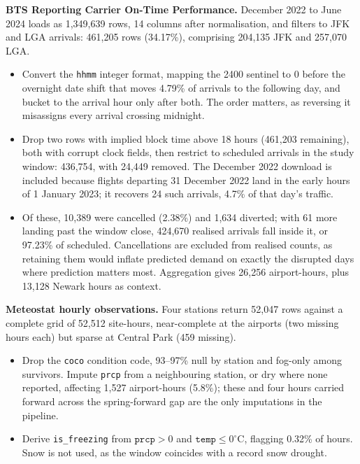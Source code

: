 \documentclass[11pt]{article}
\begin{document}
\textbf{BTS Reporting Carrier On-Time Performance.} December 2022 to June 2024
loads as 1,349,639 rows, 14 columns after normalisation, and filters to JFK and
LGA arrivals: 461,205 rows (34.17\%), comprising 204,135 JFK and 257,070 LGA.
\begin{itemize}
  \item Convert the \texttt{hhmm} integer format, mapping the 2400 sentinel to 0
        before the overnight date shift that moves 4.79\% of arrivals to the
        following day, and bucket to the arrival hour only after both. The order
        matters, as reversing it misassigns every arrival crossing midnight.
  \item Drop two rows with implied block time above 18 hours (461,203 remaining),
        both with corrupt clock fields, then restrict to scheduled arrivals in
        the study window: 436,754, with 24,449 removed. The December 2022
        download is included because flights departing 31 December 2022 land in
        the early hours of 1 January 2023; it recovers 24 such arrivals, 4.7\% of
        that day's traffic.
  \item Of these, 10,389 were cancelled (2.38\%) and 1,634 diverted; with 61 more
        landing past the window close, 424,670 realised arrivals fall inside it,
        or 97.23\% of scheduled. Cancellations are excluded from realised counts,
        as retaining them would inflate predicted demand on exactly the disrupted
        days where prediction matters most. Aggregation gives 26,256
        airport-hours, plus 13,128 Newark hours as context.
\end{itemize}
 
\textbf{Meteostat hourly observations.} Four stations return 52,047 rows against
a complete grid of 52,512 site-hours, near-complete at the airports (two missing
hours each) but sparse at Central Park (459 missing).
\begin{itemize}
  \item Drop the \texttt{coco} condition code, 93--97\% null by station and
        fog-only among survivors. Impute \texttt{prcp} from a neighbouring
        station, or dry where none reported, affecting 1,527 airport-hours
        (5.8\%); these and four hours carried forward across the spring-forward
        gap are the only imputations in the pipeline.
  \item Derive \texttt{is\_freezing} from $\texttt{prcp} > 0$ and
        $\texttt{temp} \le 0^\circ$C, flagging 0.32\% of hours. Snow is not used,
        as the window coincides with a record snow drought.
\end{itemize}
 
\end{document}
